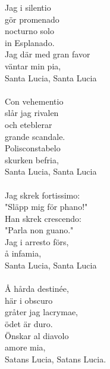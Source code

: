 
            Jag i silentio \\
            gör promenado \\
            nocturno solo \\
            in Esplanado. \\
            Jag där med gran favor \\
            väntar min pia, \\
            Santa Lucia, Santa Lucia \\
\hspace{10mm} \\
            Con vehementio \\
            slår jag rivalen \\
            och eteblerar \\
            grande scandale. \\
            Polisconstabelo \\
            skurken befria, \\
            Santa Lucia, Santa Lucia \\
\hspace{10mm} \\
            Jag skrek fortissimo: \\
            "Släpp mig för phano!" \\
            Han skrek crescendo: \\
            "Parla non guano." \\
            Jag i arresto förs, \\
            å infamia, \\
            Santa Lucia, Santa Lucia \\
\hspace{10mm} \\
            Å hårda destinée, \\
            här i obscuro \\
            gråter jag lacrymae, \\
            ödet är duro. \\
            Önskar al diavolo \\
            amore mia, \\
            Satans Lucia, Satans Lucia. \\
